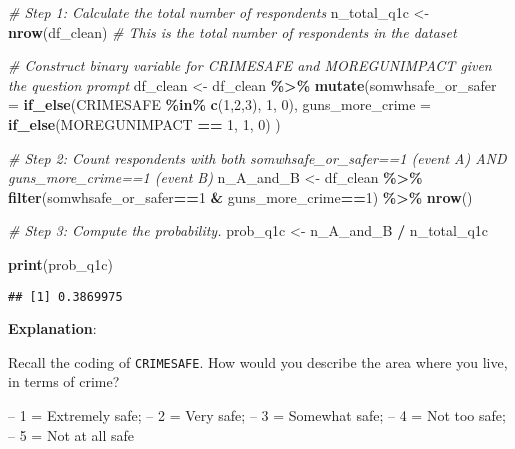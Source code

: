 \documentclass[
  11pt,
]{article}
\newenvironment{Shaded}{\begin{snugshade}}{\end{snugshade}}
\newcommand{\AttributeTok}[1]{\textcolor[rgb]{0.13,0.29,0.53}{#1}}
\newcommand{\CommentTok}[1]{\textcolor[rgb]{0.56,0.35,0.01}{\textit{#1}}}
\newcommand{\DecValTok}[1]{\textcolor[rgb]{0.00,0.00,0.81}{#1}}
\newcommand{\FunctionTok}[1]{\textcolor[rgb]{0.13,0.29,0.53}{\textbf{#1}}}
\newcommand{\NormalTok}[1]{#1}
\newcommand{\OtherTok}[1]{\textcolor[rgb]{0.56,0.35,0.01}{#1}}
\newcommand{\SpecialCharTok}[1]{\textcolor[rgb]{0.81,0.36,0.00}{\textbf{#1}}}
\begin{document}
\begin{Shaded}
\begin{Highlighting}[]
\CommentTok{\# Step 1: Calculate the total number of respondents}
\NormalTok{n\_total\_q1c }\OtherTok{\textless{}{-}} \FunctionTok{nrow}\NormalTok{(df\_clean)  }\CommentTok{\# This is the total number of respondents in the dataset}


\CommentTok{\# Construct binary variable for CRIMESAFE and MOREGUNIMPACT given the question prompt}
\NormalTok{df\_clean }\OtherTok{\textless{}{-}}\NormalTok{ df\_clean }\SpecialCharTok{\%\textgreater{}\%}
  \FunctionTok{mutate}\NormalTok{(}\AttributeTok{somwhsafe\_or\_safer =} \FunctionTok{if\_else}\NormalTok{(CRIMESAFE }\SpecialCharTok{\%in\%} \FunctionTok{c}\NormalTok{(}\DecValTok{1}\NormalTok{,}\DecValTok{2}\NormalTok{,}\DecValTok{3}\NormalTok{), }\DecValTok{1}\NormalTok{, }\DecValTok{0}\NormalTok{),}
         \AttributeTok{guns\_more\_crime =} \FunctionTok{if\_else}\NormalTok{(MOREGUNIMPACT }\SpecialCharTok{==} \DecValTok{1}\NormalTok{, }\DecValTok{1}\NormalTok{, }\DecValTok{0}\NormalTok{) }
\NormalTok{         )}

\CommentTok{\# Step 2: Count respondents with both somwhsafe\_or\_safer==1 (event A) AND guns\_more\_crime==1 (event B)}
\NormalTok{n\_A\_and\_B }\OtherTok{\textless{}{-}}\NormalTok{ df\_clean }\SpecialCharTok{\%\textgreater{}\%}
  \FunctionTok{filter}\NormalTok{(somwhsafe\_or\_safer}\SpecialCharTok{==}\DecValTok{1} \SpecialCharTok{\&}\NormalTok{ guns\_more\_crime}\SpecialCharTok{==}\DecValTok{1}\NormalTok{) }\SpecialCharTok{\%\textgreater{}\%}
  \FunctionTok{nrow}\NormalTok{()}

\CommentTok{\# Step 3: Compute the probability.}
\NormalTok{prob\_q1c }\OtherTok{\textless{}{-}}\NormalTok{ n\_A\_and\_B }\SpecialCharTok{/}\NormalTok{ n\_total\_q1c}

\FunctionTok{print}\NormalTok{(prob\_q1c)}
\end{Highlighting}
\end{Shaded}

\begin{verbatim}
## [1] 0.3869975
\end{verbatim}

\textbf{Explanation}:

Recall the coding of \texttt{CRIMESAFE}. How would you describe the area
where you live, in terms of crime?

-- 1 = Extremely safe; -- 2 = Very safe; -- 3 = Somewhat safe; -- 4 =
Not too safe; -- 5 = Not at all safe
\end{document}
